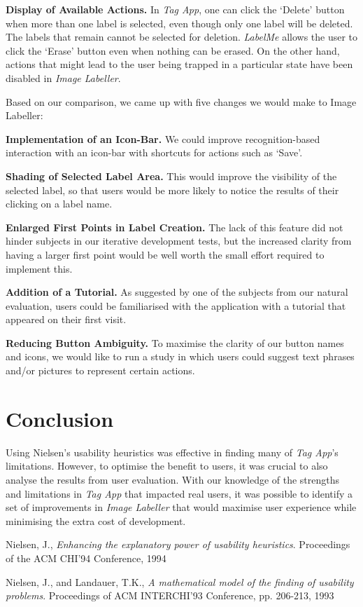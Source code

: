 \documentclass[11pt,twocolumn]{article}
\begin{document}
\textbf{Display of Available Actions.} In \emph{Tag App}, one can click the
`Delete' button when more than one label is selected, even though only one
label will be deleted. The labels that remain cannot be selected for deletion.
\emph{LabelMe} allows the user to click the `Erase' button even when nothing can be
erased. On the other hand, actions that might lead to the user being trapped in
a particular state have been disabled in \emph{Image Labeller}.

Based on our comparison, we came up with five changes we would make to Image
Labeller:

\textbf{Implementation of an Icon-Bar.} We could improve
recognition-based interaction with an icon-bar with shortcuts for actions such
as `Save'.

 \textbf{Shading of Selected Label Area.} This would improve the
visibility of the selected label, so that users would be more likely to notice
the results of their clicking on a label name. 

\textbf{Enlarged First Points in Label Creation.} The lack of this
feature did not hinder subjects in our iterative development tests, but the
increased clarity from having a larger first point would be well worth the
small effort required to implement this.

\textbf{Addition of a Tutorial.} As suggested by one of the subjects from
our natural evaluation, users could be familiarised with the application with a
tutorial that appeared on their first visit.

\textbf{Reducing Button Ambiguity.} To maximise the clarity of our button
names and icons, we would like to run a study in which users could suggest text
phrases and/or pictures to represent certain actions.

\section{Conclusion}

Using Nielsen’s usability heuristics was effective in finding many of \emph{Tag App}’s
limitations. However, to optimise the benefit to users, it was crucial to also
analyse the results from user evaluation. With our knowledge of the strengths
and limitations in \emph{Tag App} that impacted real users, it was possible to
identify a set of improvements in \emph{Image Labeller} that would maximise user
experience while minimising the extra cost of development.

\begin{thebibliography}{9}

  Nielsen, J.,
  \emph{Enhancing the explanatory power of usability heuristics}.
  Proceedings of the ACM CHI'94 Conference,
  1994

  Nielsen, J., and Landauer, T.K.,
  \emph{A mathematical model of the finding of usability problems}.
  Proceedings of ACM INTERCHI'93 Conference, pp. 206-213,
  1993

\end{thebibliography}
\end{document}
